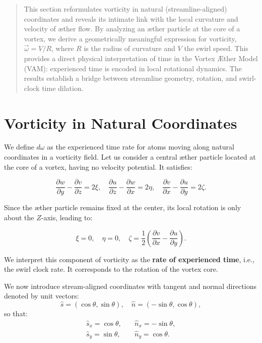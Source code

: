 \documentclass[12pt]{article}
\begin{document}
    \titlepageOpen

    \begin{abstract}
        This section reformulates vorticity in natural (streamline-aligned) coordinates and reveals its intimate link with the local curvature and velocity of æther flow. By analyzing an æther particle at the core of a vortex, we derive a geometrically meaningful expression for vorticity, \(\vec{\omega} = V / R\), where \(R\) is the radius of curvature and \(V\) the swirl speed. This provides a direct physical interpretation of time in the Vortex Æther Model (VAM): experienced time is encoded in local rotational dynamics. The results establish a bridge between streamline geometry, rotation, and swirl-clock time dilation.
    \end{abstract}


    \titlepageClose
    \fi

    \section{Vorticity in Natural Coordinates}

    We define \( d\omega \) as the experienced time rate for atoms moving along natural coordinates in a vorticity field. Let us consider a central æther particle located at the core of a vortex, having no velocity potential. It satisfies:

    \begin{equation}
        \frac{\partial w}{\partial y} - \frac{\partial v}{\partial z} = 2\xi, \quad
        \frac{\partial u}{\partial z} - \frac{\partial w}{\partial x} = 2\eta, \quad
        \frac{\partial v}{\partial x} - \frac{\partial u}{\partial y} = 2\zeta.
    \end{equation}

    Since the æther particle remains fixed at the center, its local rotation is only about the \(Z\)-axis, leading to:

    \begin{equation}
        \xi = 0, \quad \eta = 0, \quad \zeta = \frac{1}{2} \left( \frac{\partial v}{\partial x} - \frac{\partial u}{\partial y} \right).
    \end{equation}

    We interpret this component of vorticity as the \textbf{rate of experienced time}, i.e., the swirl clock rate. It corresponds to the rotation of the vortex core.

    We now introduce stream-aligned coordinates with tangent and normal directions denoted by unit vectors:
    \[
        \hat{s} = (\cos \theta, \sin \theta), \quad
        \hat{n} = (-\sin \theta, \cos \theta),
    \]
    so that:
    \begin{align}
        \hat{s}_x = \cos \theta, &\quad \hat{n}_x = -\sin \theta, \\
        \hat{s}_y = \sin \theta, &\quad \hat{n}_y = \cos \theta.
    \end{align}
\end{document}
